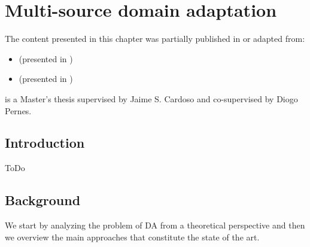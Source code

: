 
\chapter{Multi-source domain adaptation}


\label{chp:domain_adaptation}


\begin{tcolorbox}
	\small{
		The content presented in this chapter was partially published in or adapted from:
		\begin{itemize}
			\item[] \cite{ThesisFrancisco}  (presented in )
			\item[] \cite{MODAFM}  (presented in )
		\end{itemize}
		
		\cite{ThesisFrancisco} is a Master's thesis supervised by Jaime S. Cardoso and co-supervised by Diogo Pernes.
	}
\end{tcolorbox}

\section{Introduction}
\label{sec:chp3_intro}
ToDo

\section{Background}
\label{sec:chp3_background}
We start by analyzing the problem of DA from a theoretical perspective and then we overview the main approaches that constitute the state of the art.

